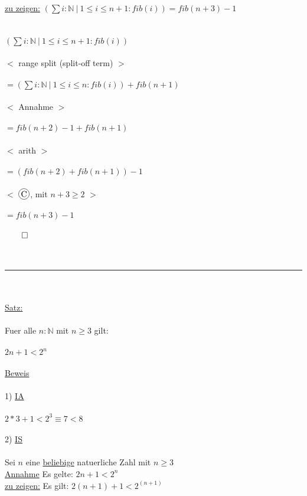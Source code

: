 \documentclass[18pt,a4paper]{article}
\newcommand*\circled[1]{\tikz[baseline=(char.base)]{
            \node[shape=circle,draw,inner sep=1pt] (char) {#1};}}
\newcommand{\tab}{\hspace*{2em}}
\begin{document}
\uline{zu zeigen:} $(\sum{i} : \mathbb{N} \:\vert\: 1\leqslant i\leqslant n+1: fib(i)) = fib(n+3) -1$\\
\\
\\
$(\sum{i} : \mathbb{N} \:\vert\: 1\leqslant i\leqslant n +1  : fib(i))$\\
\\
\tab $<$ range split (split-off term) $>$ \\
\\
$= (\sum{i} : \mathbb{N} \:\vert\: 1\leqslant i\leqslant n : fib(i)) + fib(n+1)$\\
\\
\tab $<$ Annahme $>$ \\
\\
$= fib(n+2) -1 + fib(n+1)$\\
\\
\tab $<$ arith $>$\\
\\
$= (fib(n+2) + fib(n+1)) -1$\\
\\
\tab $<$ $\circled{C}$, mit $n+3 \geqslant 2$ $>$ \\
\\
$= fib(n+3) -1 $\\
\\
$\qed$\\
\\
\\
\rule{\textwidth}{0.4mm}\\
\\
\uline{Satz:}\\
\\
Fuer alle $n:\mathbb{N}$ mit $n\geqslant3$ gilt:\\
\\
$2n+1 < 2^n$\\
\\
\uline{Beweis}\\
\\
1) \uline{IA}\\
\\
$2*3 + 1 < 2^3 \equiv 7<8$ \checkmark \\
\\
2) \uline{IS}\\
\\
Sei $n$ eine \uline{beliebige} natuerliche Zahl mit $n\geqslant 3$\\
\uline{Annahme} Es gelte: $2n+1 < 2^n$\\
\uline{zu zeigen:} Es gilt: $2(n+1)+1 < 2^{(n+1)}$\\
\end{document}
